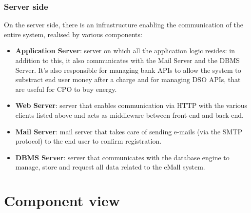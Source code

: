\subsubsection{Server side}
On the server side, there is an infrastructure enabling the communication of the entire system, realised by various components:
\begin{itemize}
    \item \textbf{Application Server}: server on which all the application logic resides: in addition to this, it also communicates with the Mail Server and the DBMS Server. It's also responsible for managing bank APIs to allow the system to substract end user money after a charge and for managing DSO APIs, that are useful for CPO to buy energy.
    \item \textbf{Web Server}: server that enables communication via HTTP with the various clients listed above and acts as middleware between front-end and back-end.
    \item \textbf{Mail Server}: mail server that takes care of sending e-mails (via the SMTP protocol) to the end user to confirm registration.
    \item \textbf{DBMS Server}: server that communicates with the database engine to manage, store and request all data related to the eMall system.
    
\end{itemize}
\section{Component view}
